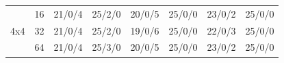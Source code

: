 \documentclass[14pt,letterpaper,hidelinks]{extarticle}
\begin{document}
\begin{table}[]
\begin{tabular}{|cc|l|l|l|l|l|l|}
\multicolumn{1}{|c|}{\multirow{3}{*}{4x4}} & 16                                   & 21/0/4                    & 25/2/0                    & 20/0/5                    & 25/0/0                    & 23/0/2                    & 25/0/0                    \\ \cline{2-8} 
\multicolumn{1}{|c|}{}                     & 32                                   & 21/0/4                    & 25/2/0                    & 19/0/6                    & 25/0/0                    & 22/0/3                    & 25/0/0                    \\ \cline{2-8} 
\multicolumn{1}{|c|}{}                     & 64                                   & 21/0/4                    & 25/3/0                    & 20/0/5                    & 25/0/0                    & 23/0/2                    & 25/0/0                    \\ \hline
\end{tabular}
\end{table}
\end{document}

